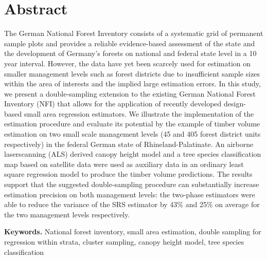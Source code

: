 
\section*{Abstract} 
\label{sec:abstract}
The German National Forest Inventory consists of a systematic grid of permanent sample plots and provides a reliable evidence-based assessment of the state and the development of Germany's forests on national and federal state level in a 10 year interval. However, the data have yet been scarcely used for estimation on smaller management levels such as forest districts due to insufficient sample sizes within the area of interests and the implied large estimation errors. In this study, we present a double-sampling extension to the existing German National Forest Inventory (NFI) that allows for the application of recently developed design-based small area regression estimators. We illustrate the implementation of the estimation procedure and evaluate its potential by the example of timber volume estimation on two small scale management levels (45 and 405 forest district units respectively) in the federal German state of Rhineland-Palatinate. An airborne laserscanning (ALS) derived canopy height model and a tree species classification map based on satellite data were used as auxiliary data in an ordinary least square regression model to produce the timber volume predictions. The results support that the suggested double-sampling procedure can substantially increase estimation precision on both management levels: the two-phase estimators were able to reduce the variance of the SRS estimator by 43\% and 25\% on average for the two management levels respectively.


\vspace{0.2cm} \noindent \textbf{Keywords.} National forest inventory, small area estimation, double sampling for regression within strata, cluster sampling, canopy height model, tree species classification \vspace{-1cm}

